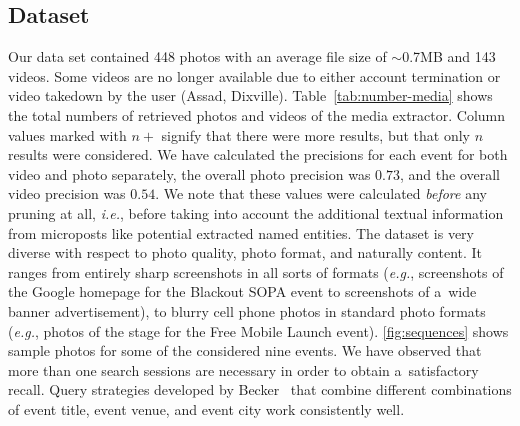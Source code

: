 \subsection{Dataset}
Our data set contained 448 photos with an average file size of
$\sim$0.7MB and 143 videos.
Some videos are no longer available due to either
account termination or video takedown by the user
(Assad, Dixville).
Table~\ref{tab:number-media}  shows the total
numbers of retrieved photos and videos of the media extractor.
Column values marked with $n+$ signify that there were more 
results, but that only $n$ results were considered. 
We have calculated the precisions for each event for both video 
and photo separately, the overall photo precision was $0.73$,
and the overall video precision was $0.54$.
We note that these values were calculated \emph{before}
any pruning at all, \emph{i.e.}, before taking into account
the additional textual information from microposts like
potential extracted named entities.
The dataset is very diverse with respect to photo quality,
photo format, and naturally content.
It ranges from entirely sharp screenshots
in all sorts of formats (\emph{e.g.},
screenshots of the Google homepage for the Blackout SOPA event
to screenshots of a~wide banner advertisement),
to blurry cell phone photos in standard photo formats
(\emph{e.g.}, photos of the stage
for the Free Mobile Launch event).
\autoref{fig:sequences} shows sample photos for
some of the considered nine events.
We have observed that more than one search sessions are necessary
in order to obtain a~satisfactory recall.
Query strategies developed by Becker~\cite{becker2012plannedevents}
that combine different combinations of event title,
event venue, and event city work consistently well.

